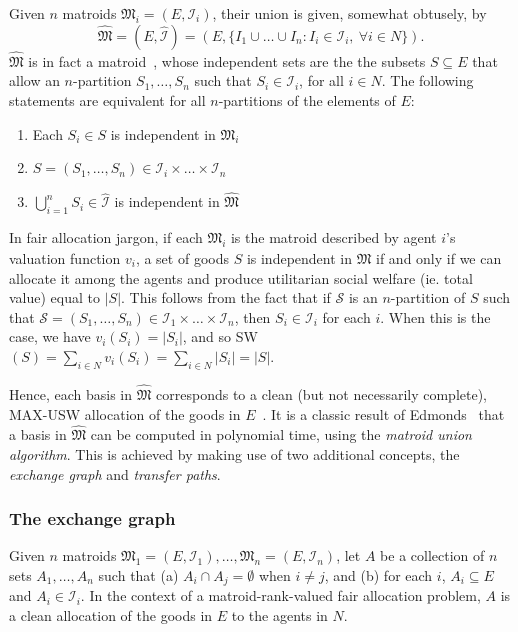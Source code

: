 Given $n$ matroids $\mathfrak{M}_i = (E, \mathcal{I}_i)$, their union is given, somewhat obtusely, by $$\widehat{\mathfrak{M}} = (E, \widehat{\mathcal{I}}) = (E, \{ I_1\cup\ldots\cup I_n : I_i\in\mathcal{I}_i,\ \forall i\in N \}).$$ 
$\widehat{\mathfrak{M}}$ is in fact a matroid~\cite[Ch. 42]{schrijver-2003}, whose independent sets are the the subsets $S\subseteq E$ that allow an $n$-partition $S_1,\ldots,S_n$ such that $S_i\in\mathcal{I}_i$, for all $i\in N$. The following statements are equivalent for all $n$-partitions of the elements of $E$:
\begin{enumerate}
  \item Each $S_i\in S$ is independent in $\mathfrak{M}_i$
  \item $S=(S_1,\dots,S_n)\in\mathcal{I}_i\times\dots\times\mathcal{I}_n$
  \item $\bigcup_{i=1}^n S_i \in \widehat{\mathcal{I}}$ is independent in $\widehat{\mathfrak{M}}$
\end{enumerate}

In fair allocation jargon, if each $\mathfrak{M}_i$ is the matroid described by agent $i$'s valuation function $v_i$, a set of goods $S$ is independent in $\widehat{\mathfrak{M}}$ if and only if we can allocate it among the agents and produce utilitarian social welfare (ie. total value) equal to $|S|$. This follows from the fact that if $\mathcal{S}$ is an $n$-partition of $S$ such that $\mathcal{S} = (S_1,\dots,S_n)\in\mathcal{I}_1\times\dots\times\mathcal{I}_n$, then $S_i\in\mathcal{I}_i$ for each $i$. When this is the case, we have $v_i(S_i) = |S_i|$, and so SW$(S) = \sum_{i\in N}v_i(S_i) = \sum_{i\in N}|S_i| = |S|$.

Hence, each basis in $\widehat{\mathfrak{M}}$ corresponds to a clean (but not necessarily complete), MAX-USW allocation of the goods in $E$~\cite{barman2021existence}. It is a classic result of Edmonds~\cite{Edmonds2009} that a basis in $\widehat{\mathfrak{M}}$ can be computed in polynomial time, using the \textit{matroid union algorithm}. This is achieved by making use of two additional concepts, the \textit{exchange graph} and \textit{transfer paths}. 

\subsubsection*{The exchange graph}
Given $n$ matroids $\mathfrak{M}_1 = (E, \mathcal{I}_1),\ldots,\mathfrak{M}_n = (E,\mathcal{I}_n)$, let $A$ be a collection of $n$ sets $A_1,\dots,A_n$ such that (a) $A_i\cap A_j = \emptyset$ when $i\neq j$, and (b) for each $i$, $A_i\subseteq E$ and $A_i\in\mathcal{I}_i$. In the context of a matroid-rank-valued fair allocation problem, $A$ is a clean allocation of the goods in $E$ to the agents in $N$.

